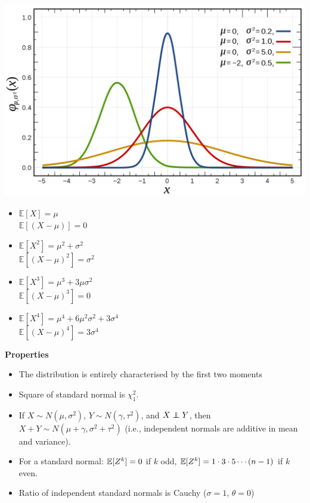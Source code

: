 \documentclass[DIV=14,titlepage=false]{scrreprt}
\begin{document}
\begin{minipage}[c]{0.5\textwidth}
\includegraphics[width=\textwidth]{./Images/univariateNormal.png}
\end{minipage}
\hfill
\begin{minipage}[c]{0.45\textwidth}
  \begin{itemize}
    \item $ \mathbb{E}[X] = \mu $ \\
    $ \mathbb{E}[(X - \mu)] = 0 $
    \item $ \mathbb{E}[X^2] = \mu^2 + \sigma^2 $ \\
    $ \mathbb{E}[(X - \mu)^2] = \sigma^2 $
    \item $ \mathbb{E}[X^3] = \mu^3 + 3\mu\sigma^2 $ \\
    $ \mathbb{E}[(X - \mu)^3] = 0 $
    \item $ \mathbb{E}[X^4] = \mu^4 + 6\mu^2\sigma^2 + 3\sigma^4 $ \\
    $ \mathbb{E}[(X - \mu)^4] = 3\sigma^4 $
  \end{itemize}
  
\end{minipage}
\textbf{Properties}
\begin{itemize}
  \item The distribution is entirely characterised by the first two moments
  \item Square of standard normal is $ \chi^2_1 $.
  \item If $ X \sim N (\mu, \sigma^2) $, $ Y \sim N (\gamma, \tau^2) $, and $ X \perp\!\!\!\!\perp Y $, then $ X + Y \sim N (\mu + \gamma, \sigma^2 + \tau^2) $ (i.e., independent normals are additive in mean and variance).
  \item For a standard normal: $ \mathbb{E} [Z^k] = 0 $ if $ k $ odd, $ \mathbb{E} [Z^k] = 1 \cdot 3 \cdot 5 \dotsm (n-1) $ if $ k $ even.
  \item Ratio of independent standard normals is Cauchy ($ \sigma = 1 $, $ \theta = 0 $)
\end{itemize}
\end{document}
